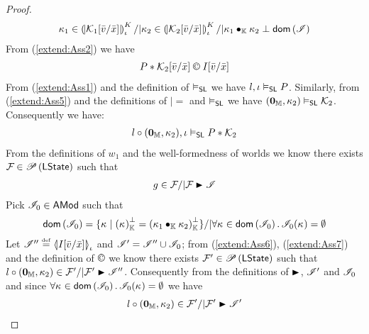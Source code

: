 \begin{lemma}
\begin{proof}
%
\begin{align}
	\ca{1} \in \semK[\lenv]{\capAss{1}[\bar{v}/\bar{x}]} /| \ca{2} \in \semK[\lenv]{\capAss{2}[\bar{v}/\bar{x}]} /| \ca{1} \composeCap \ca{2} \disjoint \dom{\lmod}
	\label{extend:Ass5}
\end{align}
%
From (\ref{extend:Ass2}) we have
%
\begin{align}
	P * \capAss{2}[\bar{v}/ \bar{x}] \confines I[\bar{v}/ \bar{x}]
	\label{extend:Ass6}
\end{align}
From (\ref{extend:Ass1}) and the definition of $\slsat$ we have $l, \lenv \slsat P$. Similarly, from (\ref{extend:Ass5}) and the definitions of $|=$ and $\slsat$ we have $(\unitH, \ca{2}) \slsat \capAss{2}$. Consequently we have:
%
\begin{align}
	l \composeL (\unitH, \ca{2}), \lenv \slsat P * \capAss{2} 
	\label{extend:Ass7}
\end{align}
%
From the definitions of $w_1$ and the well-formedness of worlds we know there exists $\fence{} \in \pset{\LStates}$ such that 
%
\begin{align}
	g \in \fence{} /| \fence{} \strictfences \lmod 
	\label{extend:Ass8}
\end{align}
%
Pick $\lmod_0 \in \AMods$ such that
%
\[
	\dom{\lmod_0} = \{\ca{} \mid \ortCap{\ca{}} = \ortCap{\ca{1} \composeCap \ca{2}} \} /| \for{\ca{} \in \dom{\lmod_0}} \lmod_0(\ca{}) = \emptyset
\]
% 
Let $\lmod'' \eqdef \semI[\lenv]{I[\bar{v} / \bar{x}]}$ and $\lmod' = \lmod'' \cup \lmod_0$; from (\ref{extend:Ass6}), (\ref{extend:Ass7}) and the definition of $\confines$ we know there exists $\fence{}' \in \pset{\LStates}$ such that $l \composeL (\unitH, \ca{2}) \in \fence{}' /| \fence{}' \strictfences \lmod''$. Consequently from the definitions of $\strictfences$, $\lmod'$ and $\lmod_0$ and since $\for{\ca{} \in \dom{\lmod_0}} \lmod_0(\ca{}) = \emptyset$ we have
%
\begin{align}
	l \composeL (\unitH, \ca{2}) \in \fence{}' /| \fence{}' \strictfences \lmod'
	\label{extend:Ass9}
\end{align}
%

\end{proof}
\end{lemma}
